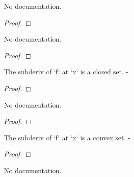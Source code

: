 \begin{theorem}\label{SubderivWithinAt.Nonempty}
        \leanok
                No documentation.
    \end{theorem}

\begin{proof}
    \leanok
\end{proof}

\begin{theorem}\label{SubderivAt.nonempty}
        \leanok
                No documentation.
    \end{theorem}

\begin{proof}
    \leanok
\end{proof}

\begin{theorem}\label{SubderivAt.isClosed}
        \leanok
                The subderiv of `f` at `x` is a closed set. -
    \end{theorem}

\begin{proof}
    \leanok
\end{proof}

\begin{theorem}\label{SubderivWithinAt.isClosed}
        \leanok
                No documentation.
    \end{theorem}

\begin{proof}
    \leanok
\end{proof}

\begin{theorem}\label{SubderivAt.convex}
        \leanok
                The subderiv of `f` at `x` is a convex set. -
    \end{theorem}

\begin{proof}
    \leanok
\end{proof}

\begin{theorem}\label{SubderivWithinAt.convex}
        \leanok
                No documentation.
    \end{theorem}

